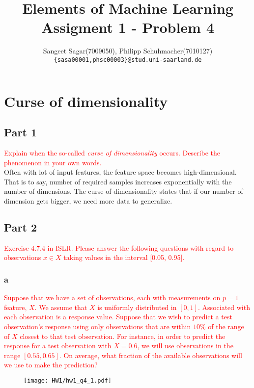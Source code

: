 \documentclass{article}[a4paper]
\title{\textbf{Elements of Machine Learning}\\
Assigment 1 - Problem 4
}
\author{ Sangeet Sagar(7009050), Philipp Schuhmacher(7010127)\\
        \texttt{\{sasa00001,phsc00003\}@stud.uni-saarland.de}
}
\begin{document}
\maketitle
\section*{Curse of dimensionality}
\subsection*{Part 1}
\textcolor{red}{Explain when the so-called \textit{curse of dimensionality} occurs. Describe the phenomenon in your own words.}\\
Often with lot of input features, the feature space becomes high-dimensional. That is to say, number of required samples increases exponentially with the number of dimensions. The curse of dimensionality states that if our number of dimension gets bigger, we need more data to generalize.

\subsection*{Part 2}
\textcolor{red}{Exercise 4.7.4 in ISLR. Please answer the following questions with regard to observations $x \in X$ taking values in the interval [0.05, 0.95].}\\

\subsubsection*{a}
\textcolor{red}{Suppose that we have a set of observations, each with measurements on $p = 1$ feature, $X$. We assume that $X$ is uniformly distributed in $[0,1]$. Associated with each observation is a response value. Suppose that we wish to predict a test observation’s response using only observations that are within $10\%$ of the range of $X$ closest to that test observation. For instance, in order to predict the response for a test observation with $X=0.6$, we will use observations in the range $[0.55, 0.65]$. On average, what fraction of the available observations will we use to make the prediction?}\\

\begin{figure}[H]
    \centering
    \texttt{[image: HW1/hw1\_q4\_1.pdf]}
\end{figure}
\end{document}
